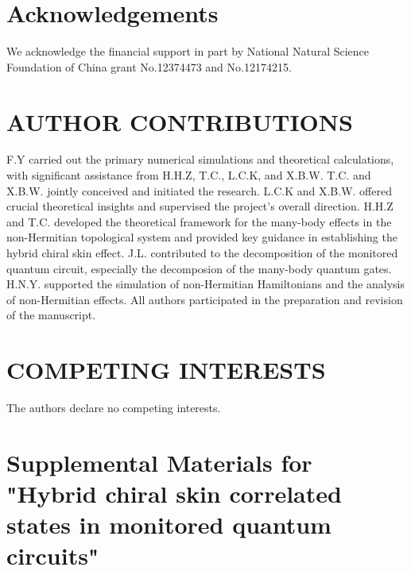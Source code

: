 \documentclass[longbibliography, aps, prx, amsmath, amssymb, amsfonts, twocolumn,superscriptaddress, footinbib]{revtex4-1}
\begin{document}
	

	\section*{Acknowledgements}
	We acknowledge the financial support in part by National Natural Science Foundation of China grant No.12374473 and No.12174215.

	
	\section*{AUTHOR CONTRIBUTIONS}
	F.Y carried out the primary numerical simulations and theoretical calculations, with significant assistance from H.H.Z, T.C., L.C.K, and X.B.W. 
	T.C. and X.B.W. jointly conceived and initiated the research. 
	L.C.K and X.B.W. offered crucial theoretical insights and supervised the project's overall direction.
	H.H.Z and T.C. developed the theoretical framework for the many-body effects in the non-Hermitian topological system and provided key guidance in establishing the hybrid chiral skin effect. 
	J.L. contributed to the decomposition of the monitored quantum circuit, especially the decomposion of the many-body quantum gates.
	H.N.Y. supported the simulation of non-Hermitian Hamiltonians and the analysis of non-Hermitian effects. 
	All authors participated in the preparation and revision of the manuscript.

	\section*{COMPETING INTERESTS}

	The authors declare no competing interests.

	
	


	\newpage
	\appendix

	\setcounter{section}{0}

    \section*{Supplemental Materials for "Hybrid chiral skin correlated states in monitored quantum circuits"}
    \setcounter{equation}{0}  %
    \setcounter{figure}{0}  %
    \renewcommand{\theequation}{S\arabic{equation}}  %
    \renewcommand{\thefigure}{S\arabic{figure}}  %
    \renewcommand{\thesubsection}{S\arabic{subsection}}  %
\end{document}
